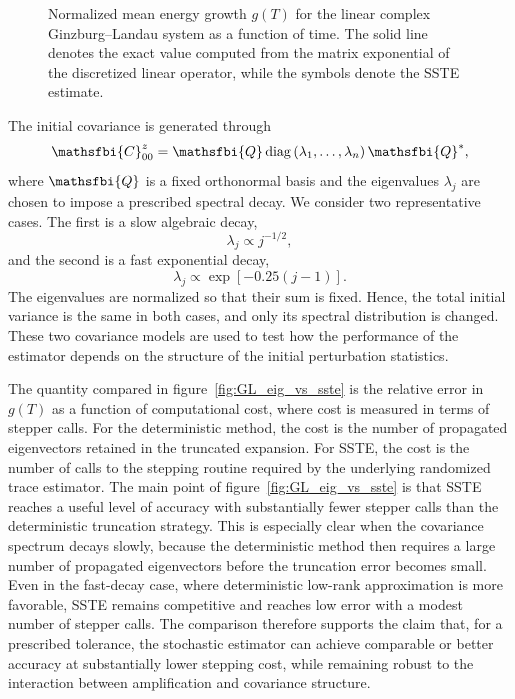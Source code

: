 \begin{appendices}
\begin{figure}
  \centering
  \begin{minipage}{0.8\textwidth}
    
  \end{minipage}
  \caption{
  Normalized mean energy growth \(g(T)\) for the linear complex Ginzburg--Landau system as a function of time.
  The solid line denotes the exact value computed from the matrix exponential of the discretized linear operator, while the symbols denote the SSTE estimate.
  }
  \label{fig:GL_trace_true_vs_sste}
\end{figure}
The initial covariance is generated through
\begin{equation}
  \mathsfbi{C}_{00}^{z}
  =
  \mathsfbi{Q}
  \operatorname{diag}
  \left(
    \lambda_1,\dots,\lambda_n
  \right)
  \mathsfbi{Q}^{*},
  \label{eq:GL_covariance_construction_sste_necessity}
\end{equation}
where \(\mathsfbi{Q}\) is a fixed orthonormal basis and the eigenvalues \(\lambda_j\) are chosen to impose a prescribed spectral decay. We consider two representative cases. The first is a slow algebraic decay,
\begin{equation}
  \lambda_j
  \propto
  j^{-1/2},
  \label{eq:GL_slow_covariance_decay}
\end{equation}
and the second is a fast exponential decay,
\begin{equation}
  \lambda_j
  \propto
  \exp
  \left[
    -0.25(j-1)
  \right].
  \label{eq:GL_fast_covariance_decay}
\end{equation}
The eigenvalues are normalized so that their sum is fixed. Hence, the total initial variance is the same in both cases, and only its spectral distribution is changed. These two covariance models are used to test how the performance of the estimator depends on the structure of the initial perturbation statistics.

The quantity compared in figure~\ref{fig:GL_eig_vs_sste} is the relative error in \(g(T)\) as a function of computational cost, where cost is measured in terms of stepper calls. For the deterministic method, the cost is the number of propagated eigenvectors retained in the truncated expansion. For SSTE, the cost is the number of calls to the stepping routine required by the underlying randomized trace estimator.
The main point of figure~\ref{fig:GL_eig_vs_sste} is that SSTE reaches a useful level of accuracy with substantially fewer stepper calls than the deterministic truncation strategy. This is especially clear when the covariance spectrum decays slowly, because the deterministic method then requires a large number of propagated eigenvectors before the truncation error becomes small. Even in the fast-decay case, where deterministic low-rank approximation is more favorable, SSTE remains competitive and reaches low error with a modest number of stepper calls. The comparison therefore supports the claim that, for a prescribed tolerance, the stochastic estimator can achieve comparable or better accuracy at substantially lower stepping cost, while remaining robust to the interaction between amplification and covariance structure.


\end{appendices}
